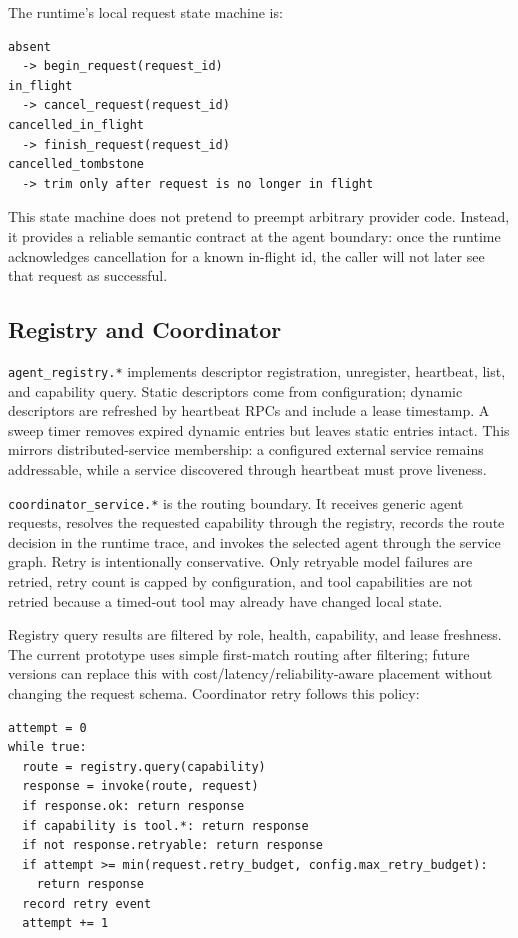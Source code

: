 \documentclass[manuscript,screen,review]{acmart}
\begin{document}
The runtime's local request state machine is:

\begin{lstlisting}
absent
  -> begin_request(request_id)
in_flight
  -> cancel_request(request_id)
cancelled_in_flight
  -> finish_request(request_id)
cancelled_tombstone
  -> trim only after request is no longer in flight
\end{lstlisting}

This state machine does not pretend to preempt arbitrary provider code. Instead,
it provides a reliable semantic contract at the agent boundary: once the runtime
acknowledges cancellation for a known in-flight id, the caller will not later see
that request as successful.

\subsection{Registry and Coordinator}

\texttt{agent\_registry.*} implements descriptor registration, unregister,
heartbeat, list, and capability query. Static descriptors come from
configuration; dynamic descriptors are refreshed by heartbeat RPCs and include a
lease timestamp. A sweep timer removes expired dynamic entries but leaves static
entries intact. This mirrors distributed-service membership: a configured
external service remains addressable, while a service discovered through
heartbeat must prove liveness.

\texttt{coordinator\_service.*} is the routing boundary. It receives generic
agent requests, resolves the requested capability through the registry, records
the route decision in the runtime trace, and invokes the selected agent through
the service graph. Retry is intentionally conservative. Only retryable model
failures are retried, retry count is capped by configuration, and tool
capabilities are not retried because a timed-out tool may already have changed
local state.

Registry query results are filtered by role, health, capability, and lease
freshness. The current prototype uses simple first-match routing after filtering;
future versions can replace this with cost/latency/reliability-aware placement
without changing the request schema. Coordinator retry follows this policy:

\begin{lstlisting}
attempt = 0
while true:
  route = registry.query(capability)
  response = invoke(route, request)
  if response.ok: return response
  if capability is tool.*: return response
  if not response.retryable: return response
  if attempt >= min(request.retry_budget, config.max_retry_budget):
    return response
  record retry event
  attempt += 1
\end{lstlisting}
\end{document}
